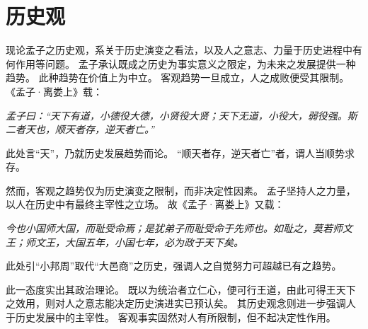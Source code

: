 \documentclass[11pt]{article}
\begin{document}
\section{历史观}
现论孟子之历史观，系关于历史演变之看法，以及人之意志、力量于历史进程中有何作用等问题。
孟子承认既成之历史为事实意义之限定，为未来之发展提供一种趋势。
此种趋势在价值上为中立。
客观趋势一旦成立，人之成败便受其限制。
《孟子·离娄上》载：

\textit{孟子曰：“天下有道，小德役大德，小贤役大贤；天下无道，小役大，弱役强。斯二者天也，顺天者存，逆天者亡。”}

此处言“天”，乃就历史发展趋势而论。
“顺天者存，逆天者亡”者，谓人当顺势求存。

\newline

然而，客观之趋势仅为历史演变之限制，而非决定性因素。
孟子坚持人之力量，以人在历史中有最终主宰性之立场。
故《孟子·离娄上》又载：

\textit{今也小国师大国，而耻受命焉；是犹弟子而耻受命于先师也。如耻之，莫若师文王；师文王，大国五年，小国七年，必为政于天下矣。}

此处引“小邦周”取代“大邑商”之历史，强调人之自觉努力可超越已有之趋势。

此一态度实出其政治理论。
既以为统治者立仁心，便可行王道，由此可得王天下之效用，则对人之意志能决定历史演进实已预认矣。
其历史观念则进一步强调人于历史发展中的主宰性。
客观事实固然对人有所限制，但不起决定性作用。
\end{document}
